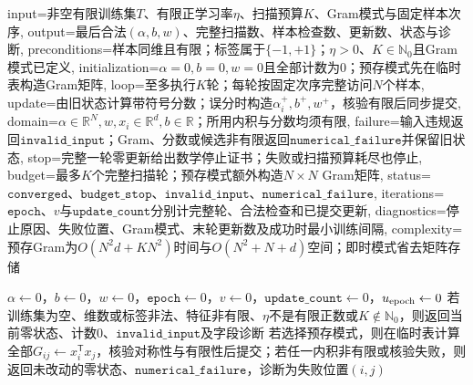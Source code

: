 \begin{AlgorithmContract}{
  input={非空有限训练集$T$、有限正学习率$\eta$、扫描预算$K$、Gram模式与固定样本次序},
  output={最后合法$(\alpha,b,w)$、完整扫描数、样本检查数、更新数、状态与诊断},
  preconditions={样本同维且有限；标签属于$\{-1,+1\}$；$\eta>0$、$K\in\mathbb N_0$且Gram模式已定义},
  initialization={$\alpha=0,b=0,w=0$且全部计数为$0$；预存模式先在临时表构造Gram矩阵},
  loop={至多执行$K$轮；每轮按固定次序完整访问$N$个样本},
  update={由旧状态计算带符号分数；误分时构造$\alpha_i^+,b^+,w^+$，核验有限后同步提交},
  domain={$\alpha\in\mathbb R^N,w,x_i\in\mathbb R^d,b\in\mathbb R$；所用内积与分数均须有限},
  failure={输入违规返回$\mathtt{invalid\_input}$；Gram、分数或候选非有限返回$\mathtt{numerical\_failure}$并保留旧状态},
  stop={完整一轮零更新给出数学停止证书；失败或扫描预算耗尽也停止},
  budget={最多$K$个完整扫描轮；预存模式额外构造$N\times N$ Gram矩阵},
  status={$\mathtt{converged}$、$\mathtt{budget\_stop}$、$\mathtt{invalid\_input}$、$\mathtt{numerical\_failure}$},
  iterations={$\mathtt{epoch}$、$v$与$\mathtt{update\_count}$分别计完整轮、合法检查和已提交更新},
  diagnostics={停止原因、失败位置、Gram模式、末轮更新数及成功时最小训练间隔},
  complexity={预存Gram为$O(N^2d+KN^2)$时间与$O(N^2+N+d)$空间；即时模式省去矩阵存储}
}
\begin{algorithm}[H]
\caption{感知机学习算法的对偶形式}\label{alg:V2-C01-dual}
$\alpha\leftarrow0$，$b\leftarrow0$，$w\leftarrow0$，$\mathtt{epoch}\leftarrow0$，$v\leftarrow0$，$\mathtt{update\_count}\leftarrow0$，$u_{\rm epoch}\leftarrow0$\;
若训练集为空、维数或标签非法、特征非有限、$\eta$不是有限正数或$K\notin\mathbb N_0$，则返回当前零状态、计数$0$、$\mathtt{invalid\_input}$及字段诊断\;
若选择预存模式，则在临时表计算全部$G_{ij}\leftarrow x_i^{\mathsf T}x_j$，核验对称性与有限性后提交；若任一内积非有限或核验失败，则返回未改动的零状态、$\mathtt{numerical\_failure}$，诊断为失败位置$(i,j)$\;
\end{algorithm}
\end{AlgorithmContract}
